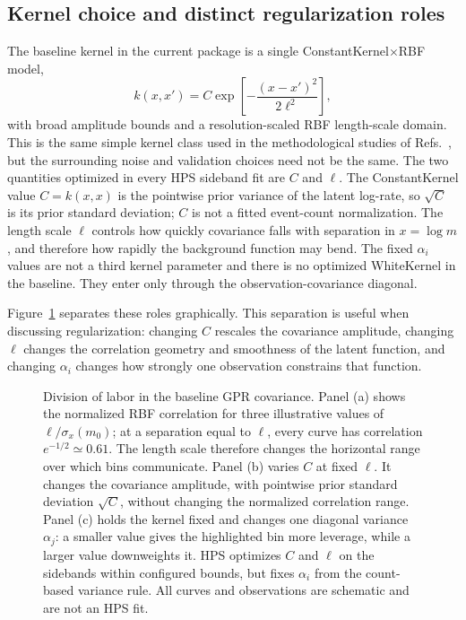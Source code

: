 \subsection{Kernel choice and distinct regularization roles}
\label{sec:kernel-choice}

The baseline kernel in the current package is a single
ConstantKernel$\times$RBF model,
\begin{equation}
k(x,x') = C \exp\!\left[-\frac{(x-x')^2}{2\ell^2}\right],
\end{equation}
with broad amplitude bounds and a resolution-scaled RBF length-scale domain. This is
the same simple kernel class used in the methodological studies of
Refs.~\cite{Gandrakota2023,BarrLiu2025}, but the surrounding noise and validation
choices need not be the same. The two quantities optimized in every HPS sideband fit
are $C$ and $\ell$. The ConstantKernel value $C=k(x,x)$ is the pointwise prior
variance of the latent log-rate, so $\sqrt{C}$ is its prior standard deviation; $C$
is not a fitted event-count normalization. The length scale $\ell$ controls how
quickly covariance falls with separation in $x=\log m$, and therefore how rapidly
the background function may bend. The fixed $\alpha_i$ values are not a third kernel
parameter and there is no optimized WhiteKernel in the baseline. They enter only
through the observation-covariance diagonal.

Figure~\ref{fig:gpr-hyperparameter-roles} separates these roles graphically. This
separation is useful when discussing regularization: changing $C$ rescales the
covariance amplitude, changing $\ell$ changes the correlation geometry and smoothness
of the latent function, and changing $\alpha_i$ changes how strongly one observation
constrains that function.

\begin{figure}[H]
\centering
{}
\caption{Division of labor in the baseline GPR covariance. Panel (a) shows the
normalized RBF correlation for three illustrative values of
$\ell/\sigma_x(m_0)$; at a separation equal to $\ell$, every curve has correlation
$e^{-1/2}\simeq0.61$. The length scale therefore changes the horizontal range over
which bins communicate. Panel (b) varies $C$ at fixed $\ell$. It changes the
covariance amplitude, with pointwise prior standard deviation $\sqrt{C}$, without
changing the normalized correlation range. Panel (c) holds the kernel fixed and
changes one diagonal variance $\alpha_j$: a smaller value gives the highlighted bin
more leverage, while a larger value downweights it. HPS optimizes $C$ and $\ell$ on
the sidebands within configured bounds, but fixes $\alpha_i$ from the count-based
variance rule. All curves and observations are schematic and are not an HPS fit.}
\label{fig:gpr-hyperparameter-roles}
\end{figure}

